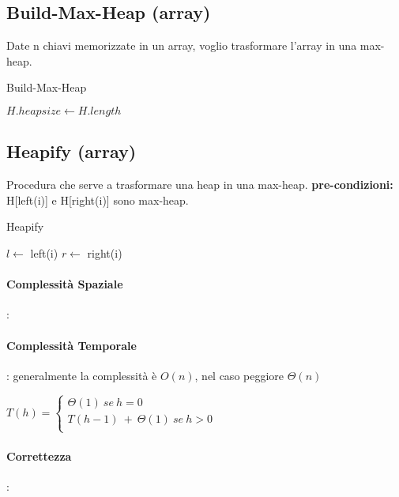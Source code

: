 \documentclass{article}
\DeclarePairedDelimiter\floor{\lfloor}{\rfloor}
\begin{document}
\hypertarget{buildmaxheap}{}\subsection{Build-Max-Heap (array)} %
Date n chiavi memorizzate in un array, voglio trasformare l'array in una max-heap.

\begin{algorithm}[H]
\caption{Build-Max-Heap}
$H.heapsize \leftarrow H.length$\;
\end{algorithm}

\hypertarget{heapify}{}\subsection{Heapify (array)} %
Procedura che serve a trasformare una heap in una max-heap. \newline
\textbf{pre-condizioni:} H[left(i)] e H[right(i)] sono max-heap.


\begin{algorithm}[H]
\caption{Heapify}
$l \leftarrow$ left(i)\;
$r \leftarrow$ right(i)\;
\end{algorithm}

\paragraph{Complessità Spaziale}: 
\paragraph{Complessità Temporale}: generalmente la complessità è $O(n)$, nel caso peggiore $\Theta(n)$

$T(h) =\begin{cases}
    \Theta(1) \ se \ h = 0 \\
    T(h-1) \ + \ \Theta(1) \ se \ h > 0 \\
\end{cases}$
\paragraph{Correttezza}:
\end{document}

